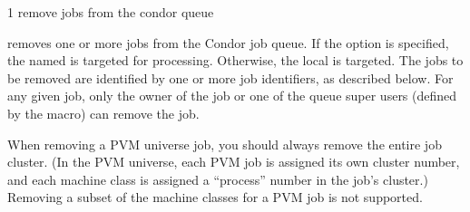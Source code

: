 \begin{ManPage}{\label{man-condor-rm}}{1}
{remove jobs from the condor queue}
\Synopsis {}


\Description

 removes one or more jobs from the Condor job queue.  
If the  option is specified, the named  is targeted
for processing.  
Otherwise, the local  is targeted.
The jobs to be removed are identified by one or more job identifiers, as
described below.
For any given job, only the owner of the job or one of the queue super users
(defined by the  macro) can remove the job.

\begin{Options}
\end{Options}

\GenRem

When removing a PVM universe job, you should always remove the entire
job cluster.  (In the PVM universe, each PVM job is assigned its own
cluster number, and each machine class is assigned a ``process''
number in the job's cluster.)  Removing a subset of the machine
classes for a PVM job is not supported.

\end{ManPage}
